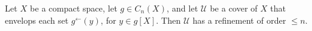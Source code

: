 Let $X$ be a compact space, let $g \in C_n(X)$, and let $\mathcal{U}$ be a cover of $X$ that envelops each set $g^\leftarrow(y)$, for $y \in g[X]$. Then $\mathcal{U}$ has a refinement of order $\leq n$.
